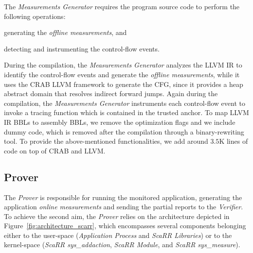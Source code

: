 The \emph{Measurements Generator} requires the program source code to perform 
the following operations:
\begin{enumerate*}[label=(\roman*)]
	\item generating the \emph{offline measurements}, and 
	\item detecting and instrumenting the control-flow events.
\end{enumerate*}
During the compilation, the \emph{Measurements Generator} analyzes the LLVM IR 
to identify the control-flow events and generate the \emph{offline 
measurements}, while it uses the CRAB LLVM framework to generate the CFG, since 
it provides a heap abstract domain that resolves indirect forward jumps.
Again during the compilation, the \emph{Measurements Generator} instruments 
each control-flow event to invoke a tracing function 
which is contained in the trusted anchor.
To map LLVM IR BBLs to assembly BBLs, we remove the optimization flags and we 
include dummy code,
which is removed after the compilation through a binary-rewriting tool.
To provide the above-mentioned functionalities, we add around $3.5$K lines of 
code on top of CRAB and LLVM. %

\subsection{Prover}
\label{ssec:prover}
The \emph{Prover} is responsible for running the monitored application, 
generating the application \emph{online measurements} and sending the partial 
reports to the \emph{Verifier}. 
To achieve the second aim, the \emph{Prover} relies on the architecture 
depicted in Figure~\ref{fig:architecture_scarr}, which encompasses several 
components 
belonging either to the user-space (\ie \emph{Application Process} and 
\emph{ScaRR Libraries}) or to the kernel-space (\ie \emph{ScaRR 
sys\_addaction}, \emph{ScaRR Module}, and \emph{ScaRR sys\_measure}). 

